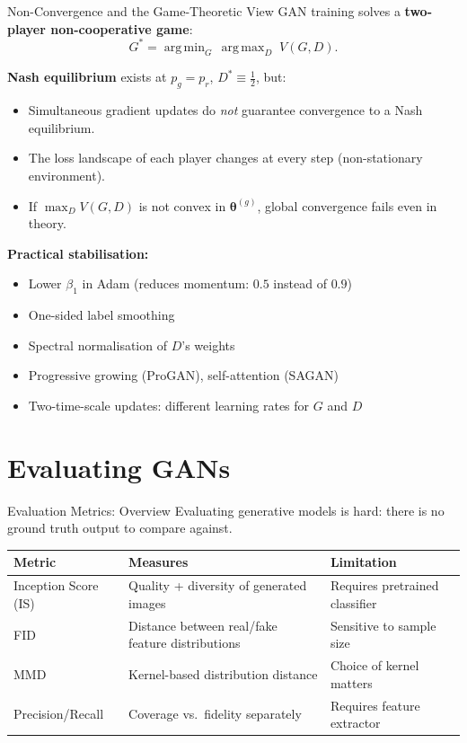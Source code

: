 \documentclass[aspectratio=169,11pt]{beamer}
\newcommand{\btheta}{\bm{\theta}}
\newcommand{\pr}{p_{r}}           %
\newcommand{\pg}{p_{g}}           %
\DeclareMathOperator*{\argmax}{arg\,max}
\DeclareMathOperator*{\argmin}{arg\,min}
\begin{document}
\begin{frame}{Non-Convergence and the Game-Theoretic View}
  GAN training solves a \textbf{two-player non-cooperative game}:
  \[
    G^* = \argmin_G\,\argmax_D\;V(G,D).
  \]

  \medskip
  \textbf{Nash equilibrium} exists at $\pg=\pr$, $D^*\equiv\tfrac{1}{2}$, but:
  \begin{itemize}
    \item Simultaneous gradient updates do \emph{not} guarantee convergence
          to a Nash equilibrium.
    \item The loss landscape of each player changes at every step
          (non-stationary environment).
    \item If $\max_D V(G,D)$ is not convex in $\btheta^{(g)}$,
          global convergence fails even in theory.
  \end{itemize}

  \medskip
  \textbf{Practical stabilisation:}
  \begin{itemize}
    \item Lower $\beta_1$ in Adam (reduces momentum: $0.5$ instead of $0.9$)
    \item One-sided label smoothing
    \item Spectral normalisation of $D$'s weights
    \item Progressive growing (ProGAN), self-attention (SAGAN)
    \item Two-time-scale updates: different learning rates for $G$ and $D$
  \end{itemize}
\end{frame}

\section{Evaluating GANs}

\begin{frame}{Evaluation Metrics: Overview}
  Evaluating generative models is hard: there is no ground truth output to compare against.

  \medskip
  \begin{center}
  \renewcommand{\arraystretch}{1.25}
  \begin{tabular}{p{2.8cm}p{4.5cm}p{3.5cm}}
    \toprule
    \textbf{Metric} & \textbf{Measures} & \textbf{Limitation}\\
    \midrule
    Inception Score (IS) & Quality + diversity of generated images & Requires pretrained classifier\\
    FID & Distance between real/fake feature distributions & Sensitive to sample size\\
    MMD & Kernel-based distribution distance & Choice of kernel matters\\
    Precision/Recall & Coverage vs.\ fidelity separately & Requires feature extractor\\
    \bottomrule
  \end{tabular}
  \end{center}
\end{frame}
\end{document}
